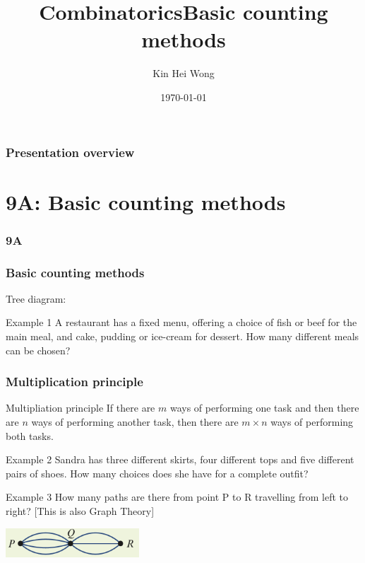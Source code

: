\documentclass[
	11pt, %
]{beamer}
\title{Combinatorics}
\author{Kin Hei Wong}
\date{\today}
\begin{document}
\begin{frame}
    \titlepage
\end{frame}

\begin{frame}
    \frametitle{Presentation overview}
    \tableofcontents
\end{frame}

\section{9A: Basic counting methods}
\begin{frame}
    \frametitle{9A}
    \begin{center}
        \title{Basic counting methods}
        \maketitle
    \end{center}
\end{frame}

\begin{frame}[t]
    \frametitle{Basic counting methods}
    Tree diagram:
    \begin{block}{Example 1}
        A restaurant has a fixed menu, offering a choice of fish or beef for the main meal, and cake, pudding or ice-cream for dessert. How many different meals can be chosen?
    \end{block}
\end{frame}

\begin{frame}[t]
    \frametitle{Multiplication principle}
    \begin{block}{Multipliation principle}
        If there are $m$ ways of performing one task and then there are $n$ ways of performing
        another task, then there are $m\times n$ ways of performing both tasks.
    \end{block}
    \begin{block}{Example 2}
        Sandra has three different skirts, four different tops and five different pairs of shoes. How
        many choices does she have for a complete outfit?
    \end{block}
    \begin{block}{Example 3}
        How many paths are there from point P to R travelling from left to right? [This is also Graph Theory]\\
        \begin{center}
            \includegraphics[width = 5cm]{Example3.png}
        \end{center}
    \end{block}
\end{frame}
\end{document}
